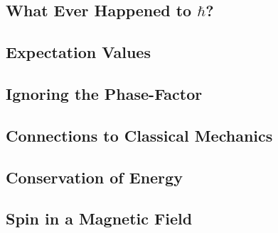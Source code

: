 \documentclass[a4paper]{article}
\begin{document}
\subsection{What Ever Happened to $\hbar$?}
\subsection{Expectation Values}
\subsection{Ignoring the Phase-Factor}
\subsection{Connections to Classical Mechanics}


\subsection{Conservation of Energy}
\subsection{Spin in a Magnetic Field}
\end{document}
